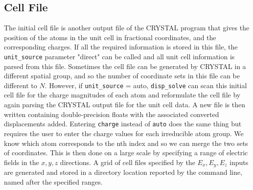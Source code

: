 \subsection{Cell File}
The initial cell file is another output file of the CRYSTAL program that gives the position of the atoms in the unit cell in fractional coordinates, and the corresponding charges. If all the required information is stored in this file, the \texttt{unit\_source} parameter "direct" can be called and all unit cell information is parsed from this file. Sometimes the cell file can be generated by CRYSTAL in a different spatial group, and so the number of coordinate sets in this file can be different to $N$. However, if \texttt{unit\_source} = auto, \texttt{disp\_solve} can scan this initial cell file for the charge magnitudes of each atom and reformulate the cell file by again parsing the CRYSTAL output file for the unit cell data. A new file is then written containing double-precision floats with the associated converted displacements added. Entering \texttt{charge} instead of \texttt{auto} does the same thing but requires the user to enter the charge values for each irreducible atom group. We know which atom corresponds to the nth index and so we can merge the two sets of coordinates. This is then done on a large scale by specifying a range of electric fields in the $x,y,z$ directions. A grid of cell files specified by the $E_x,E_y,E_z$ inputs are generated and stored in a directory location reported by the command line, named after the specified ranges. 



